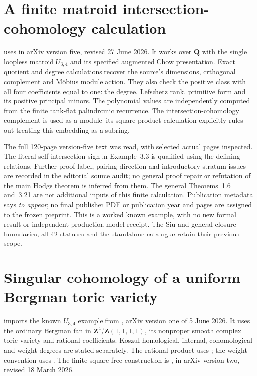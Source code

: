 \section{A finite matroid intersection-cohomology calculation}
\label{sec:provenance-matroid-intersection-module}

 uses
\cite[Definitions~2.2, 2.5 and~3.4, Example~3.7]{BHM26SingularHodge}
in arXiv version five, revised 27 June 2026. It works over
$\mathbf Q$ with the single loopless matroid $U_{3,4}$ and its
specified augmented Chow presentation. Exact quotient and degree
calculations recover the source's dimensions, orthogonal complement
and M\"obius module action. They also check the positive class with
all four coefficients equal to one: the degree, Lefschetz rank,
primitive form and its positive principal minors. The polynomial
values are independently computed from the finite rank-flat
palindromic recurrence. The intersection-cohomology complement is
used as a module; its square-product calculation explicitly rules
out treating this embedding as a subring.

The full 120-page version-five text was read, with selected actual
pages inspected. The literal self-intersection sign in Example~3.3
is qualified using the defining relations. Further proof-label,
pairing-direction and introductory-stratum issues are recorded in
the editorial source audit; no general proof repair or refutation
of the main Hodge theorem is inferred from them. The general
Theorems~1.6 and~3.21 are not additional inputs of this finite
calculation. Publication metadata says \emph{to appear}; no final
publisher PDF or publication year and pages are assigned to the
frozen preprint. This is a worked known example, with no new formal
result or independent production-model receipt. The Siu and general
closure boundaries, all $42$ statuses and the standalone catalogue
retain their previous scope.

\section{Singular cohomology of a uniform Bergman toric variety}
\label{sec:provenance-uniform-singular-cohomology}

 imports the known
$U_{3,4}$ example from \cite[Example~3.20]{Binder26UniformCohomology},
arXiv version one of 5 June 2026. It uses the ordinary Bergman fan
in $\mathbf Z^4/\mathbf Z(1,1,1,1)$, its nonproper smooth complex
toric variety and rational coefficients. Koszul homological,
internal, cohomological and weight degrees are stated separately.
The rational product uses \cite[Theorems~1.1 and~1.2]
{FranzFu24Naturality}; the weight convention uses
\cite[\S\S3.2 and~5]{Weber04ToricWeights}.
The finite square-free construction is
\cite[Definition~A.4 and Lemma~A.5]{Binder26SingularCohomology},
in arXiv version two, revised 18 March 2026.

